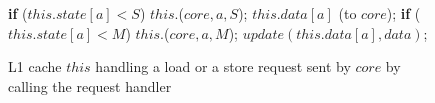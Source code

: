\begin{figure}
\small
\begin{algorithmic}
    \State \textbf{if} ($this.state[a] < S$)
    \State \;\;\;\; \call{} $this.$\uReq($core, a, S$);
    \State \send{} $this.data[a]$ (to $core$);
    \State \textbf{if} ($this.state[a] < M$)
    \State \;\;\;\; \call{} $this.$\uReq($core, a, M$);
    \State $update(this.data[a], data)$;
  \EndIf
\EndProc
\end{algorithmic}
\caption{L1 cache $this$ handling a load or a store request sent by $core$ by
calling the request handler}
\label{coreHandle}
\end{figure}




